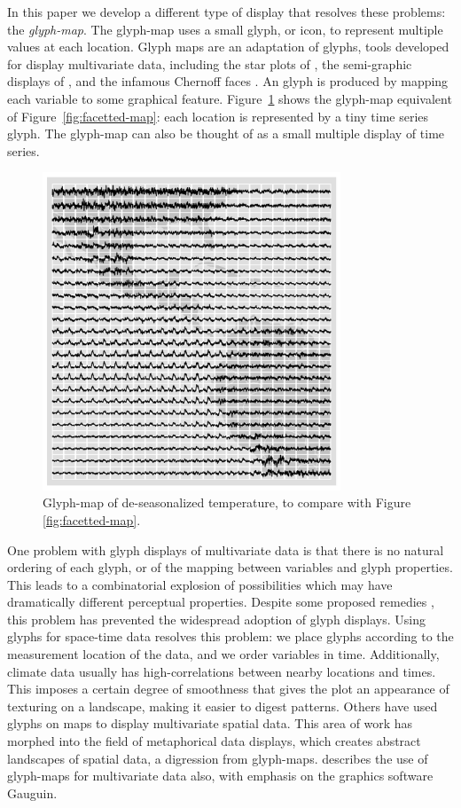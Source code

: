 \documentclass[oneside]{article}
\begin{document}

In this paper we develop a different type of display that resolves these problems: the \emph{glyph-map}. The glyph-map uses a small glyph, or icon, to represent multiple values at each location. Glyph maps are an adaptation of glyphs, tools developed for display multivariate data, including the star plots of \citet{mayr:1877}, the semi-graphic displays of \citet{anderson:1960}, and the infamous Chernoff faces \citep{chernoff:1973}. An glyph is produced by mapping each variable to some graphical feature. Figure~\ref{fig:nasa-deseas-glyph} shows the glyph-map equivalent of Figure~\ref{fig:facetted-map}: each location is represented by a tiny time series glyph. The glyph-map can also be thought of as a small multiple display \citet{tufte:2001} of time series. 

\begin{figure}[htbp]
  \centering
  \includegraphics[width=3.5in]{nasa-deseas-glyph.png}
  \caption{Glyph-map of de-seasonalized temperature, to compare with Figure \ref{fig:facetted-map}. }
  \label{fig:nasa-deseas-glyph}
\end{figure}

One problem with glyph displays of multivariate data is that there is no natural ordering of each glyph, or of the mapping between variables and glyph properties. This leads to a combinatorial explosion of possibilities which may have dramatically different perceptual properties. Despite some proposed remedies \citep{kleiner:1981,hurley:2010}, this problem has prevented the widespread adoption of glyph displays. Using glyphs for space-time data resolves this problem: we place glyphs according to the measurement location of the data, and we order variables in time. Additionally, climate data usually has high-correlations between nearby locations and times. This imposes a certain degree of smoothness that gives the plot an appearance of texturing on a landscape, making it easier to digest patterns.
Others \citet{pickett:1988} have used glyphs on maps to display multivariate spatial data. This area of work has morphed into the field of metaphorical data displays, which creates abstract landscapes of spatial data, a digression from glyph-maps. \citet{gribov:2006} describes the use of glyph-maps for multivariate data also, with emphasis on the graphics software Gauguin. 
\end{document}
